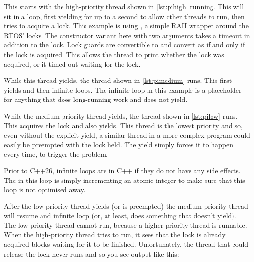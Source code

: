 This starts with the high-priority thread shown in \ref{lst:pihigh} running.
This will sit in a loop, first yielding for up to a second to allow other threads to run, then tries to acquire a lock.
This example is using , a simple RAII wrapper around the RTOS' locks.
The constructor variant here with two arguments takes a timeout in addition to the lock.
Lock guards are convertible to  and convert as  if and only if the lock is acquired.
This allows the thread to print whether the lock was acquired, or it timed out waiting for the lock.

\codelisting[filename=examples/priority_inheritance/priority_inheritance.cc,marker=high,label=lst:pihigh,caption="A high-priority thread that will be starved"]{}

While this thread yields, the thread shown in \ref{lst:pimedium} runs.
This first yields and then infinite loops.
The infinite loop in this example is a placeholder for anything that does long-running work and does not yield.

\codelisting[filename=examples/priority_inheritance/priority_inheritance.cc,marker=medium,label=lst:pimedium,caption="A medium-priority thread that will starve a high-priority thread"]{}

While the medium-priority thread yields, the thread shown in \ref{lst:pilow} runs.
This acquires the lock and also yields.
This thread is the lowest priority and so, even without the explicit yield, a similar thread in a more complex program could easily be preempted with the lock held.
The yield simply forces it to happen every time, to trigger the problem.

\begin{note}
	Prior to C++26, infinite loops are  in C++ if they do not have any side effects.
	The  in this loop is simply incrementing an atomic integer to make sure that this loop is not optimised away.
\end{note}

\codelisting[filename=examples/priority_inheritance/priority_inheritance.cc,marker=low,label=lst:pilow,caption="A low-priority thread that will be preempted with a lock held"]{}

After the low-priority thread yields (or is preempted) the medium-priority thread will resume and infinite loop (or, at least, does something that doesn't yield).
The low-priority thread cannot run, because a higher-priority thread is runnable.
When the high-priority thread tries to run, it sees that the lock is already acquired blocks waiting for it to be finished.
Unfortunately, the thread that could release the lock never runs and so you see output like this:

